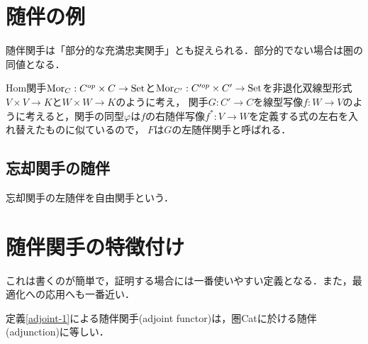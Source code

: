 \documentclass[uplatex, dvipdfmx]{jsreport}
\begin{document}
\section{随伴の例}

\begin{screen}
    随伴関手は「部分的な充満忠実関手」とも捉えられる．部分的でない場合は圏の同値となる．
\end{screen}

\begin{remark}
    Hom関手$\mathrm{Mor}_C:C^{op}\times C\to\mathrm{Set}$と$\mathrm{Mor}_{C'}:C'^{op}\times C'\to\mathrm{Set}$を非退化双線型形式$V\times V\to K$と$W\times W\to K$のように考え，
    関手$G:C'\to C$を線型写像$f:W\to V$のように考えると，関手の同型$\varphi$は$f$の右随伴写像$f^*:V\to W$を定義する式の左右を入れ替えたものに似ているので，
    $F$は$G$の左随伴関手と呼ばれる．
\end{remark}

\subsection{忘却関手の随伴}

\begin{screen}
    忘却関手の左随伴を自由関手という．
\end{screen}

\begin{example}[TopとSet]
    
\end{example}

\section{随伴関手の特徴付け}

\begin{definition}[普遍射を用いた定義]
    
\end{definition}
これは書くのが簡単で，証明する場合には一番使いやすい定義となる．また，最適化への応用へも一番近い．

\begin{definition}
    
\end{definition}

\begin{proposition}
    定義\ref{adjoint-1}による随伴関手(adjoint functor)は，圏Catに於ける随伴(adjunction)に等しい．
\end{proposition}
\end{document}
